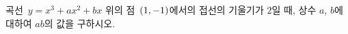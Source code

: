 곡선~$y=x^3+ax^2+bx$ 위의 점~$(1{,}\mkern3mu\mathopen{}-1)$에서의 접선의 기울기가 $2$일 때, 상수 $a$, $b$에 대하여 $ab$의 값을 구하시오.
